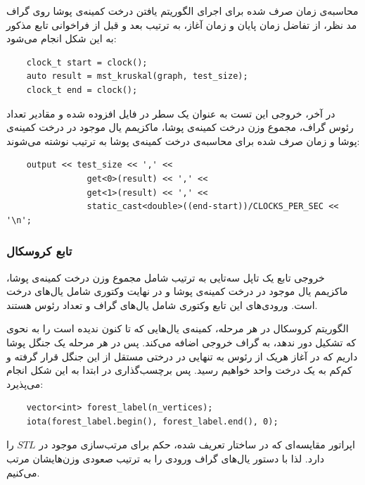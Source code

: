 \documentclass{article}
\begin{document}
محاسبه‌ی زمان صرف شده برای اجرای الگوریتم یافتن درخت کمینه‌ی پوشا روی گراف مد نظر، از تفاضل زمان پایان و زمان آغاز، به ترتیب بعد و قبل از فراخوانی تابع مذکور به این شکل انجام می‌شود:

\begin{latin} 
\begin{verbatim}
    clock_t start = clock();
    auto result = mst_kruskal(graph, test_size);
    clock_t end = clock();
\end{verbatim}
\end{latin}

در آخر، خروجی این تست به عنوان یک سطر در فایل
افزوده شده و مقادیر تعداد رئوس گراف، مجموع وزن درخت کمینه‌ی پوشا، ماکزیمم یال موجود در درخت کمینه‌ی پوشا و زمان صرف شده برای محاسبه‌ی درخت کمینه‌ی پوشا به ترتیب نوشته می‌شوند:

\begin{latin}
\begin{verbatim}
    output << test_size << ',' <<
                get<0>(result) << ',' <<
                get<1>(result) << ',' <<
                static_cast<double>((end-start))/CLOCKS_PER_SEC << '\n';
\end{verbatim}
\end{latin}
\subsubsection{تابع کروسکال}
خروجی تابع
یک تاپل سه‌تایی
به ترتیب شامل مجموع وزن درخت کمینه‌ی پوشا، ماکزیمم یال موجود در درخت کمینه‌ی پوشا و در نهایت وکتوری شامل یال‌های درخت است. ورودی‌های این تابع
وکتوری شامل یال‌های گراف و
تعداد رئوس هستند.

الگوریتم کروسکال در هر مرحله، کمینه‌ی یال‌هایی که تا کنون ندیده است را به نحوی که تشکیل دور ندهد، به گراف خروجی اضافه می‌کند. پس در هر مرحله یک جنگل پوشا داریم که در آغاز هریک از رئوس به تنهایی در درختی مستقل از این جنگل قرار گرفته و کم‌کم به یک درخت واحد خواهیم رسید. پس برچسب‌گذاری در ابتدا به این شکل انجام می‌پذیرد:

\begin{latin}
\begin{verbatim}
    vector<int> forest_label(n_vertices);
    iota(forest_label.begin(), forest_label.end(), 0);
\end{verbatim}
\end{latin}

اپراتور مقایسه‌ای که در ساختار
تعریف شده، حکم
برای مرتب‌سازی موجود در
$STL$
را دارد. لذا با دستور
یال‌های گراف ورودی را به ترتیب صعودی وزن‌هایشان مرتب می‌کنیم.
\end{document}

